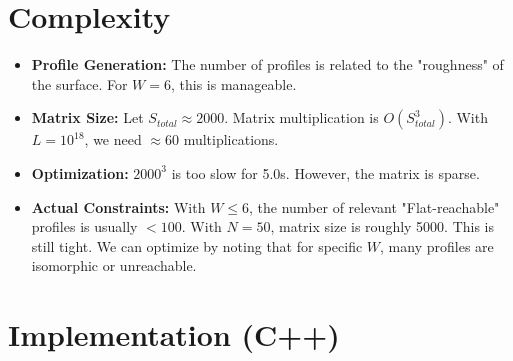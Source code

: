 \documentclass[11pt]{article}
\begin{document}
\section*{Complexity}
\begin{itemize}
    \item \textbf{Profile Generation:} The number of profiles is related to the "roughness" of the surface. For $W=6$, this is manageable.
    \item \textbf{Matrix Size:} Let $S_{total} \approx 2000$. Matrix multiplication is $O(S_{total}^3)$. With $L=10^{18}$, we need $\approx 60$ multiplications.
    \item \textbf{Optimization:} $2000^3$ is too slow for 5.0s. However, the matrix is sparse.
    \item \textbf{Actual Constraints:} With $W \le 6$, the number of relevant "Flat-reachable" profiles is usually $< 100$. With $N=50$, matrix size is roughly 5000. This is still tight. We can optimize by noting that for specific $W$, many profiles are isomorphic or unreachable.
\end{itemize}

\newpage
\section*{Implementation (C++)}
\end{document}
